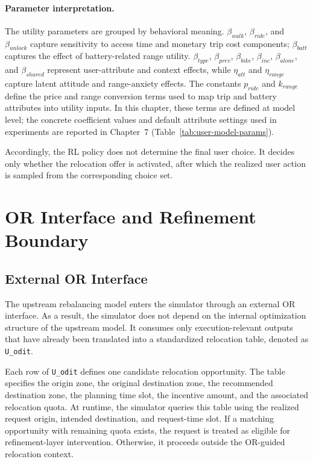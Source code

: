 \paragraph{Parameter interpretation.}
The utility parameters are grouped by behavioral meaning.  
\(\beta_{walk}\), \(\beta_{ride}\), and \(\beta_{unlock}\) capture sensitivity to access time and monetary trip cost components; \(\beta_{batt}\) captures the effect of battery-related range utility.  
\(\beta_{type}\), \(\beta_{prev}\), \(\beta_{bike}\), \(\beta_{inc}\), \(\beta_{alone}\), and \(\beta_{shared}\) represent user-attribute and context effects, while \(\eta_{att}\) and \(\eta_{range}\) capture latent attitude and range-anxiety effects.  
The constants \(p_{ride}\) and \(k_{range}\) define the price and range conversion terms used to map trip and battery attributes into utility inputs.  
In this chapter, these terms are defined at model level; the concrete coefficient values and default attribute settings used in experiments are reported in Chapter~7 (Table~\ref{tab:user-model-params}).

Accordingly, the RL policy does not determine the final user choice. It decides only whether the relocation offer is activated, after which the realized user action is sampled from the corresponding choice set.

\section{OR Interface and Refinement Boundary}

\subsection{External OR Interface}

The upstream rebalancing model enters the simulator through an external OR interface. As a result, the simulator does not depend on the internal optimization structure of the upstream model. It consumes only execution-relevant outputs that have already been translated into a standardized relocation table, denoted as \texttt{U\_odit}.

Each row of \texttt{U\_odit} defines one candidate relocation opportunity. The table specifies the origin zone, the original destination zone, the recommended destination zone, the planning time slot, the incentive amount, and the associated relocation quota. At runtime, the simulator queries this table using the realized request origin, intended destination, and request-time slot. If a matching opportunity with remaining quota exists, the request is treated as eligible for refinement-layer intervention. Otherwise, it proceeds outside the OR-guided relocation context.

